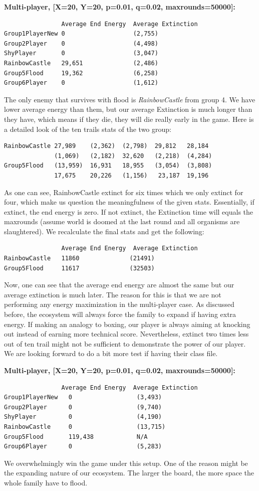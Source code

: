 \textbf{Multi-player, [X=20, Y=20, p=0.01, q=0.02, maxrounds=50000]:}
\begin{verbatim}
                Average End Energy	Average Extinction
Group1PlayerNew 0                   (2,755)
Group2Player    0                   (4,498)
ShyPlayer       0                   (3,047)
RainbowCastle   29,651              (2,486)
Group5Flood     19,362              (6,258)
Group6Player    0                   (1,612)
\end{verbatim}
The only enemy that survives with flood is \textit{RainbowCastle} from group 4.
We have lower average energy than them, but our average Extinction is much longer than
they have, which means if they die, they will die really early in the game.
Here is a detailed look of the ten trails stats of the two group:
\begin{verbatim}
RainbowCastle 27,989    (2,362)  (2,798)  29,812   28,184   
              (1,069)   (2,182)  32,620   (2,218)  (4,284) 
Group5Flood   (13,959)  16,931   18,955   (3,054)  (3,808)
              17,675    20,226   (1,156)   23,187  19,196 
\end{verbatim}
As one can see, RainbowCastle extinct for six times which we only extinct for four, 
which make us question the meaningfulness of the given stats.
Essentially, if extinct, the end energy is zero.
If not extinct, the Extinction time will equals the maxrounds
(assume world is doomed at the last round and all organisms are slaughtered).
We recalculate the final stats and get the following:
\begin{verbatim}
                Average End Energy	Average Extinction
RainbowCastle   11860              (21491)
Group5Flood     11617              (32503)
\end{verbatim}
Now, one can see that the average end energy are almost the same but our average extinction 
is much later.
The reason for this is that we are not performing any energy maximization in the multi-player case. As discussed before, the ecosystem will always force the family to expand if having extra energy.
If making an analogy to boxing, our player is always aiming at knocking out instead of earning more technical score.
Nevertheless, extinct two times less out of ten trail might not be sufficient to demonstrate the power of our player. 
We are looking forward to do a bit more test if having their class file.

\textbf{Multi-player, [X=20, Y=20, p=0.01, q=0.02, maxrounds=50000]:}
\begin{verbatim}
                Average End Energy	Average Extinction
Group1PlayerNew   0                  (3,493)
Group2Player      0                  (9,740)
ShyPlayer         0                  (4,190)
RainbowCastle     0                  (13,715)
Group5Flood       119,438            N/A
Group6Player      0                  (5,283)
\end{verbatim}
We overwhelmingly win the game under this setup.
One of the reason might be the expanding nature of our ecosystem.
The larger the board, the more space the whole family have to flood.


